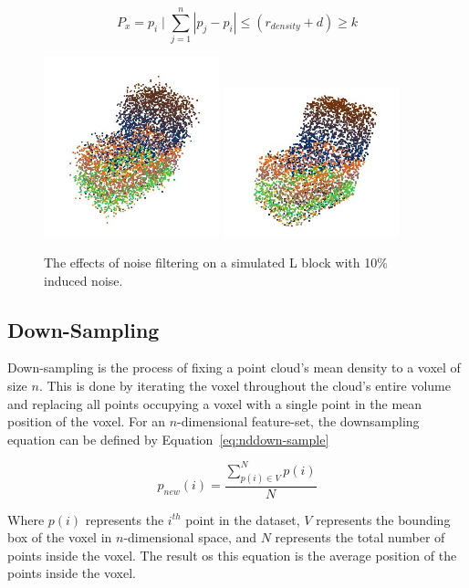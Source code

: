 \documentclass[12pt]{drexelthesis}
\let\Oldsubsection\subsection
\renewcommand{\subsection}{\FloatBarrier\Oldsubsection}
\begin{document}
\begin{equation}
	P_{x} = p_{i} \mid \sum_{j=1}^n |p_{j} - p_{i}| \leq (r_{density} + d) \geq k
\end{equation}

\begin{figure}[!ht]
	\centering
		\includegraphics[width=2in]{l_block_pt_cloud10pnoise.jpg} \includegraphics[width=2in]{l_block_pt_cloud10pnoiseFILTEREDk100std05.jpg}
	\caption[Effects of noise filter on simulated point cloud objects]{\centering The effects of noise filtering on a simulated L block with 10\% induced noise.}
\end{figure}


\subsection{Down-Sampling}
Down-sampling is the process of fixing a point cloud’s mean density to a voxel of size $n$. This is done by iterating the voxel throughout the cloud’s entire volume and replacing all points occupying a voxel with a single point in the mean position of the voxel. For an $n$-dimensional feature-set, the downsampling equation can be defined by Equation~\ref{eq:nddown-sample}

\begin{equation}
	\label{eq:nddown-sample}
	p_{new} (i) = \frac {\sum_{p(i) \in V}^{N} p(i) }  {N}
\end{equation}

Where $p(i)$ represents the $i^{th}$ point in the dataset, $V$ represents the bounding box of the voxel in $n$-dimensional space, and $N$ represents the total number of points inside the voxel. The result os this equation is the average position of the points inside the voxel.
\end{document}
